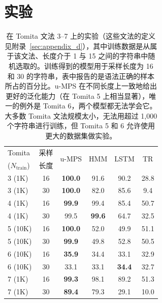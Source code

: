 \section{实验}
\label{sec:experiments}
%
\begin{table}[t]
\caption{在 Tomita 文法 3--7 上的实验（这些文法的定义见附录~\ref{sec:appendix_d}），其中训练数据是从属于该文法、长度介于 1 与 15 之间的字符串中随机选取的。训练得到的模型用于采样长度为 16 和 30 的字符串，表中报告的是语法正确的样本所占的百分比。u-MPS 在不同长度上一致地给出更好的泛化能力（在 Tomita 5 上相当显著），唯一的例外是 Tomita 6，两个模型都无法学会它。大多数 Tomita 文法规模太小，无法用超过 1,000 个字符串进行训练，但 Tomita 5 和 6 允许使用更大的数据集做实验。}
\label{tab:tomita}
\setlength\aboverulesep{0.1pt}
\setlength\belowrulesep{0.1pt}
\renewcommand{\arraystretch}{1.1}
\begin{center}
\begin{small}
\begin{sc}
\begin{tabular}{lc|cccc}
    Tomita & 采样 & \multirow{2}{*}{u-MPS} & \multirow{2}{*}{HMM} & \multirow{2}{*}{LSTM} & \multirow{2}{*}{TR} \\
    ($N_{\mathrm{train}}$) & 长度 &  &  &  \\
    \midrule
    3 (1K)  & 16 & \textbf{100.0} & 91.6          & 90.2          & 28.8 \\
    3 (1K)  & 30 & \textbf{100.0} & 82.0          & 85.6          & 9.4  \\
    4 (1K)  & 16 & \textbf{99.9}  & 99.4          & 85.4          & 50.7 \\
    4 (1K)  & 30 & 99.5           & \textbf{99.6} & 64.7          & 32.5 \\
    5 (10K) & 16 & \textbf{100.0} & 52.0          & 49.9          & 51.1 \\
    5 (10K) & 30 & \textbf{99.9}  & 49.8          & 52.8          & 50.5 \\
    6 (10K) & 16 & \textbf{35.9}  & 34.4          & 33.1          & 32.9 \\
    6 (10K) & 30 & 33.1           & 33.1          & \textbf{34.4} & 32.7 \\
    7 (1K)  & 16 & \textbf{99.3}  & 98.1          & 89.2          & 51.3 \\
    7 (1K)  & 30 & \textbf{89.4}  & 79.3          & 29.1          & 10.0 \\


\end{tabular}
\end{sc}
\end{small}
\end{center}
\end{table}
